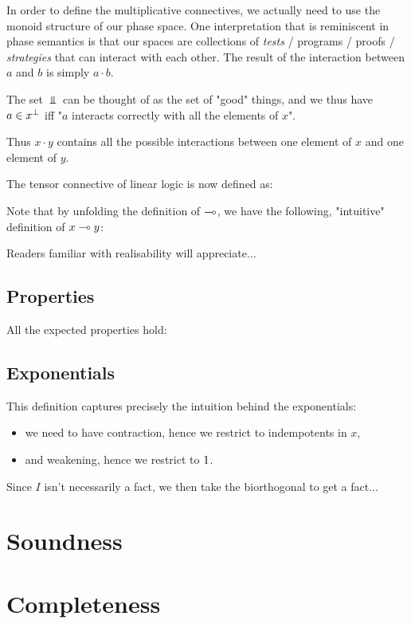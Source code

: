 In order to define the multiplicative connectives, we actually need to
use the monoid structure of our phase space. One interpretation that is
reminiscent in phase semantics is that our spaces are collections of
\emph{tests} / programs / proofs / \emph{strategies} that can interact
with each other. The result of the interaction between \(a\) and \(b\)
is simply \(a\cdot b\).

The set \(\Bot\) can be thought of as the set of "good" things, and we
thus have \(a\in x^\bot\) iff "\(a\) interacts correctly with all the
elements of \(x\)".

Thus \(x\cdot y\) contains all the possible interactions between one
element of \(x\) and one element of \(y\).

The tensor connective of linear logic is now defined as:

Note that by unfolding the definition of \(\multimap\), we have the
following, "intuitive" definition of \(x\multimap y\):

Readers familiar with realisability will appreciate...

\subsection{Properties}\label{properties}

All the expected properties hold:

\subsection{Exponentials}\label{exponentials-3}

This definition captures precisely the intuition behind the exponentials:
\begin{itemize}
\item we need to have contraction, hence we restrict to indempotents in \(x\),
\item and weakening, hence we restrict to \(1\).
\end{itemize}

Since \(I\) isn't necessarily a fact, we then take the biorthogonal to get a fact...

\section{Soundness}\label{soundness}

\section{Completeness}\label{completeness}

